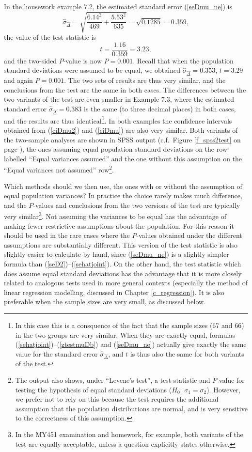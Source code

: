 In the housework example 7.2, the estimated standard error (\ref{seDmu_ne}) is
\[
\hat{\sigma}_{\hat{\Delta}}=
\sqrt{
\frac{6.14^{2}}{469}+
\frac{5.53^{2}}{635}
}=
\sqrt{0.1285}=0.359,
\]
the value of the test statistic is
\[
t=\frac{1.16}{0.359}=3.23,
\]
and the two-sided $P$-value is now $P=0.001$. Recall that
when the population standard deviations
were assumed to be equal, we obtained
$\hat{\sigma}_{\hat{\Delta}}=0.353$, $t=3.29$ and again $P=0.001$. The
two sets of results are thus very similar, and the conclusions from the
test are the same in both cases. The differences between the two
variants of the test are even smaller in Example 7.3, where the
estimated standard error $\hat{\sigma}_{\hat{\Delta}}=0.383$ is the same
(to three decimal places) in both cases, and the results are thus
identical\footnote{In this case this is a consquence of the fact that
the sample sizes (67 and 66) in the two groups are very similar. When
they are exactly equal, formulas
(\ref{sehatjoint})--(\ref{ztestmuDb}) and (\ref{seDmu_ne}) actually give
exactly the same value for the standard error
$\hat{\sigma}_{\hat{\Delta}}$, and $t$ is thus also the same for both
variants of the test.
}. In both examples the confidence intervals obtained
from (\ref{ciDmu2}) and (\ref{ciDmu}) are also very similar.
Both variants of the two-sample analyses are shown in SPSS output (c.f.\
Figure \ref{f_spss2test} on page \pageref{f_spss2test}), the ones
assuming equal population standard deviations on the row labelled
``Equal variances assumed'' and the one without this assumption on the
``Equal variances not assumed'' row\footnote{The output also shows,
under ``Levene's test'', a test statistic and $P$-value for testing the
hypothesis of equal standard deviations ($H_{0}: \,
\sigma_{1}=\sigma_{2}$). However, we prefer not to rely on this because
the test requires the additional assumption that the population
distributions are normal, and is very sensitive to the correctness of
this assumption.}.

Which methods should we then use, the ones with or without the assumption of
equal population variances? In practice the choice rarely makes much
difference, and the $P$-values and conclusions from the two versions of
the test are typically very similar\footnote{In the MY451 examination
and homework, for example, both variants of the test are equally
acceptable, unless a question explicitly states otherwise.}.
Not assuming the variances to be equal
has the advantage of making fewer restrictive assumptions about the
population. For
this reason it should be used in the rare cases where the $P$-values
obtained under the different assumptions are substantially different.
This version of the test statistic is also slightly easier to calculate
by hand, since (\ref{seDmu_ne}) is a slightly simpler formula than
(\ref{seD2})--(\ref{sehatjoint}). On the other hand, the test statistic
which does assume equal standard deviations has the advantage that it is
more closely related to analogous tests used in more general contexts
(especially the method of linear regression modelling, discussed in Chapter
\ref{c_regression}). It is also preferable when the sample
sizes are very small, as discussed below.



